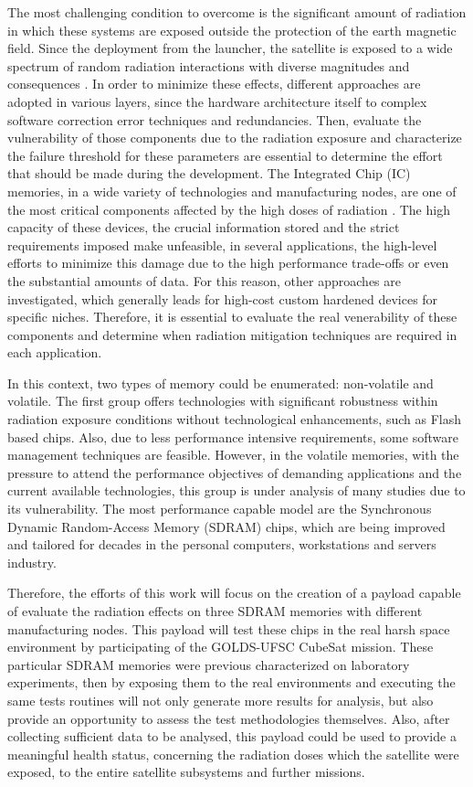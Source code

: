The most challenging condition to overcome is the significant amount of radiation in which these systems are exposed outside the protection of the earth magnetic field. Since the deployment from the launcher, the satellite is exposed to a wide spectrum of random radiation interactions with diverse magnitudes and consequences \cite{space_mission_analysis_rad_cap}. In order to minimize these effects, different approaches are adopted in various layers, since the hardware architecture itself to complex software correction error techniques and redundancies. Then, evaluate the vulnerability of those components due to the radiation exposure and characterize the failure threshold for these parameters are essential to determine the effort that should be made during the development.  
The Integrated Chip (IC) memories, in a wide variety of technologies and manufacturing nodes, are one of the most critical components affected by the high doses of radiation \cite{viyas_gupta_thesis}. The high capacity of these devices, the crucial information stored and the strict requirements imposed make unfeasible, in several applications, the high-level efforts to minimize this damage due to the high performance trade-offs or even the substantial amounts of data. For this reason, other approaches are investigated, which generally leads for high-cost custom hardened devices for specific niches. Therefore, it is essential to evaluate the real venerability of these components and determine when radiation mitigation techniques are required in each application.

In this context, two types of memory could be enumerated: non-volatile and volatile. The first group offers technologies with significant robustness within radiation exposure conditions without technological enhancements, such as Flash based chips. Also, due to less performance intensive requirements, some software management techniques are feasible. However, in the volatile memories, with the pressure to attend the performance objectives of demanding applications and the current available technologies, this group is under analysis of many studies due to its vulnerability. The most performance capable model are the Synchronous Dynamic Random-Access Memory (SDRAM) chips, which are being improved and tailored for decades in the personal computers, workstations and servers industry. 


Therefore, the efforts of this work will focus on the creation of a payload capable of evaluate the radiation effects on three SDRAM memories with different manufacturing nodes. This payload will test these chips in the real harsh space environment by participating of the GOLDS-UFSC CubeSat mission. These particular SDRAM memories were previous characterized on laboratory experiments, then by exposing them to the real environments and executing the same tests routines will not only generate more results for analysis, but also provide an opportunity to assess the test methodologies themselves. Also, after collecting sufficient data to be analysed, this payload could be used to provide a meaningful health status, concerning the radiation doses which the satellite were exposed, to the entire satellite subsystems and further missions.


